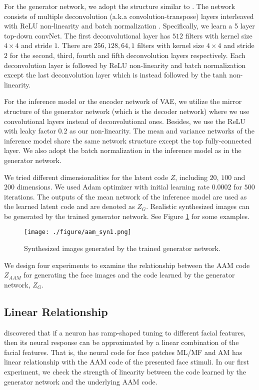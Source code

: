 \documentclass{article}
\begin{document}
For the generator network, we adopt the structure similar to \cite{radford2015unsupervised,Alexey2015}. The network consists of multiple deconvolution (a.k.a convolution-transpose) layers interleaved with ReLU non-linearity and batch normalization \cite{Ioffe2015BatchNA}. Specifically, we learn a 5 layer top-down convNet. The first deconvolutional layer has $512$ filters with kernel size $4\times4$ and stride  $1$. There are $256, 128, 64, 1$ filters with kernel size $4\times4$ and stride $2$ for the second, third, fourth and fifth deconvolution layers respectively. Each deconvolution layer is followed by ReLU non-linearity and batch normalization except the last deconvolution layer which is instead followed by the tanh non-linearity.

For the inference model or the encoder network of VAE, we utilize the mirror structure of the generator network (which is the decoder network) where we use convolutional layers instead of deconvolutional ones. Besides, we use the ReLU with leaky factor $0.2$ as our non-linearity. The mean and variance networks of the inference model share the same network structure except the top fully-connected layer. We also adopt the batch normalization in the inference model as in the generator network.

We tried different dimensionalities for the latent code $Z$, including $20$, $100$ and $200$ dimensions. We used Adam optimizer \cite{kingma2014adam} with initial learning rate $0.0002$ for $500$ iterations. The outputs of the mean network of the inference model are used as the learned latent code and are denoted as $Z_{G}$.  Realistic synthesized images can be generated by the trained generator network.  See Figure \ref{fig:VAE_syn} for some examples.

\begin{figure}[h]
	\begin{center}
		\texttt{[image: ./figure/aam\_syn1.png]} %
		\caption{Synthesized images generated by the trained generator network.}
		\label{fig:VAE_syn}
	\end{center}
\end{figure}


We design four experiments to examine the relationship between the AAM code $Z_{AAM}$ for generating the face images and the code learned by the generator network, $Z_{G}$.

\subsection{Linear Relationship}
 \cite{chang2017code} discovered that  if a neuron has ramp-shaped tuning to different facial features, then its neural response can be approximated by a linear combination of the facial features. That is, the neural code for face patches ML/MF and AM has linear relationship with the AAM code of the presented face stimuli. In our first experiment, we check the strength of linearity between the code learned by the generator network and the underlying AAM code.
\end{document}
